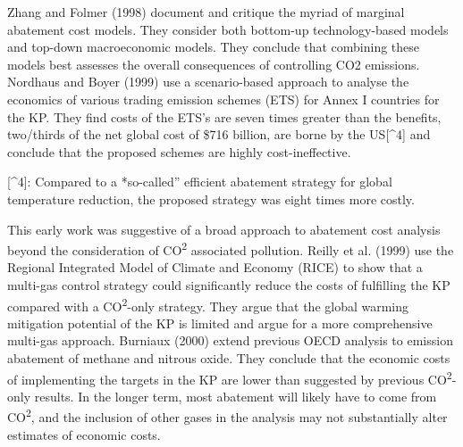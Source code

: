 \documentclass[
  letterpaper,
  DIV=11,
  numbers=noendperiod]{scrartcl}
\begin{document}
Zhang and Folmer (1998) document and critique the myriad of marginal
abatement cost models. They consider both bottom-up technology-based
models and top-down macroeconomic models. They conclude that combining
these models best assesses the overall consequences of controlling CO2
emissions. Nordhaus and Boyer (1999) use a scenario-based approach to
analyse the economics of various trading emission schemes (ETS) for
Annex I countries for the KP. They find costs of the ETS's are seven
times greater than the benefits, two/thirds of the net global cost of
\$716 billion, are borne by the US{[}\^{}4{]} and conclude that the
proposed schemes are highly cost-ineffective.

{[}\^{}4{]}: Compared to a *so-called'' efficient abatement strategy for
global temperature reduction, the proposed strategy was eight times more
costly.

This early work was suggestive of a broad approach to abatement cost
analysis beyond the consideration of CO\textsuperscript{2} associated
pollution. Reilly et al. (1999) use the Regional Integrated Model of
Climate and Economy (RICE) to show that a multi-gas control strategy
could significantly reduce the costs of fulfilling the KP compared with
a CO\textsuperscript{2}-only strategy. They argue that the global
warming mitigation potential of the KP is limited and argue for a more
comprehensive multi-gas approach. Burniaux (2000) extend previous OECD
analysis to emission abatement of methane and nitrous oxide. They
conclude that the economic costs of implementing the targets in the KP
are lower than suggested by previous CO\textsuperscript{2}-only results.
In the longer term, most abatement will likely have to come from
CO\textsuperscript{2}, and the inclusion of other gases in the analysis
may not substantially alter estimates of economic costs.
\end{document}
